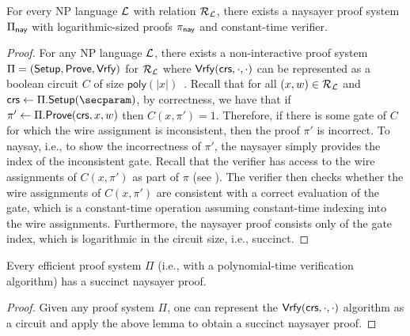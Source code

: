 \begin{lemma}\label{thm:naysayingNPCircuit}
    For every NP language $\mathcal{L}$ with relation $\mathcal{R}_{\mathcal{L}}$, 
    there exists a naysayer proof system $\Pi_{\mathsf{nay}}$ with logarithmic-sized proofs $\pi_{\mathsf{nay}}$ and constant-time verifier.
\end{lemma}
\begin{proof}
    For any NP language $\mathcal{L}$, there exists a non-interactive proof system $\Pi = (\mathsf{Setup}, \mathsf{Prove}, \mathsf{Vrfy})$ for $\mathcal{R}_{\mathcal{L}}$ where $\mathsf{Vrfy}(\mathsf{crs}, \cdot, \cdot)$ can be represented as a boolean circuit $C$ of size $\mathsf{poly}(\lvert x \rvert)$~\cite{C:LapSha90}. Recall that for all $(x,w) \in \mathcal{R}_{\mathcal{L}}$ and $\crs \gets \Pi.\setup(\secparam)$, by correctness, we have that if $\pi' \gets \Pi.\mathsf{Prove}(\mathsf{crs}, x, w)$ then $C(x,\pi') = 1$. Therefore, if there is some gate of $C$ for which the wire assignment is inconsistent, then the proof $\pi'$ is incorrect. To naysay, i.e., to show the incorrectness of $\pi'$, the naysayer simply provides the index of the inconsistent gate.
    Recall that the verifier has access to the wire assignments of $C(x,\pi')$ as part of $\pi$ (see ). 
    The verifier then checks whether the wire assignments of $C(x,\pi')$ are consistent with a correct evaluation of the gate, which is a constant-time operation assuming constant-time indexing into the wire assignments. 
    Furthermore, the naysayer proof consists only of the gate index, which is logarithmic in the circuit size, i.e., succinct.

\end{proof}

\begin{theorem}
    Every efficient proof system $\Pi$ (i.e., with a polynomial-time verification algorithm) has a succinct naysayer proof.
\end{theorem}
\begin{proof}
Given any proof system $\Pi$, one can represent the $\mathsf{Vrfy}(\mathsf{crs},\cdot,\cdot)$ algorithm as a circuit and apply the above lemma to obtain a succinct naysayer proof.
\end{proof}

